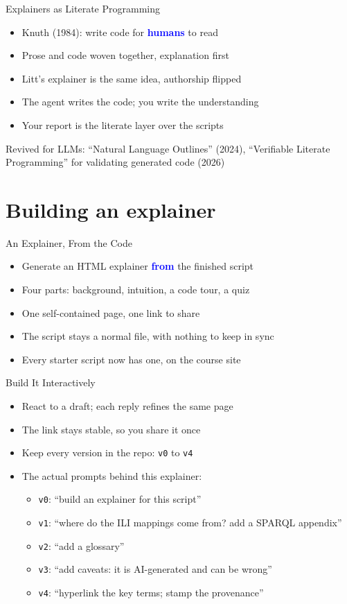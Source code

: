 \documentclass[xetex,aspectratio=169]{beamer}
\newcommand{\txx}[1]{\textbf{\textcolor{blue}{#1}}}
\begin{document}
\begin{frame}{Explainers as Literate Programming}
  \begin{itemize}
  \item Knuth (1984): write code for \txx{humans} to read
  \item Prose and code woven together, explanation first
  \item Litt's explainer is the same idea, authorship flipped
  \item The agent writes the code; you write the understanding
  \item Your report is the literate layer over the scripts
  \end{itemize}
  \vfill
  \scriptsize Revived for LLMs: ``Natural Language Outlines'' (2024),
  ``Verifiable Literate Programming'' for validating generated code (2026)
\end{frame}

\section{Building an explainer}

\begin{frame}{An Explainer, From the Code}
  \begin{itemize}
  \item Generate an HTML explainer \txx{from} the finished script
  \item Four parts: background, intuition, a code tour, a quiz
  \item One self-contained page, one link to share
  \item The script stays a normal file, with nothing to keep in sync
  \item Every starter script now has one, on the course site
  \end{itemize}
\end{frame}

\begin{frame}{Build It Interactively}
  \begin{itemize}
  \item React to a draft; each reply refines the same page
  \item The link stays stable, so you share it once
  \item Keep every version in the repo: \texttt{v0} to \texttt{v4}
  \item The actual prompts behind this explainer:
    \begin{itemize}
    \item \texttt{v0}: ``build an explainer for this script''
    \item \texttt{v1}: ``where do the ILI mappings come from? add a SPARQL appendix''
    \item \texttt{v2}: ``add a glossary''
    \item \texttt{v3}: ``add caveats: it is AI-generated and can be wrong''
    \item \texttt{v4}: ``hyperlink the key terms; stamp the provenance''
    \end{itemize}
  \end{itemize}
\end{frame}
\end{document}
